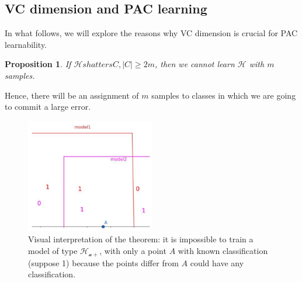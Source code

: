 \subsection{VC dimension and PAC learning}

In what follows, we will explore the reasons why VC dimension is crucial for PAC learnability.

\vspace{1em}

\newtheorem{proposition}{Proposition}
\begin{proposition}
    If $\mathcal{H} shatters C, |C| \ge 2m$, then we cannot learn $\mathcal{H}$ with $m$ samples.
\end{proposition}

Hence, there will be an assignment of $m$ samples to classes in which we are going to commit a large error.

\begin{figure}[H]
    \centering
    \includegraphics[width=0.5\textwidth]{assets/PAC_and_VC.png}
    \caption{Visual interpretation of the theorem: it is impossible to train a model of type $\mathcal{H_{a+}}$, with only a point $A$ with known classification (suppose 1) because the points differ from $A$ could have any classification.}
\end{figure}